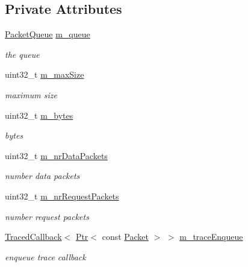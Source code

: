 \subsection*{Private Attributes}
\begin{DoxyCompactItemize}
\item 
\hyperlink{classns3_1_1WimaxMacQueue_a075c9b703ce5eef7fe1844db1758657a}{Packet\+Queue} \hyperlink{classns3_1_1WimaxMacQueue_ad372c20acfe0acf6df6280662d63bdae}{m\+\_\+queue}
\begin{DoxyCompactList}\small\item\em the queue \end{DoxyCompactList}\item 
uint32\+\_\+t \hyperlink{classns3_1_1WimaxMacQueue_aca04b5018ab36d96092f19467d381efd}{m\+\_\+max\+Size}
\begin{DoxyCompactList}\small\item\em maximum size \end{DoxyCompactList}\item 
uint32\+\_\+t \hyperlink{classns3_1_1WimaxMacQueue_a79c3fd93dfef8c78b074c2aa6f2266ea}{m\+\_\+bytes}
\begin{DoxyCompactList}\small\item\em bytes \end{DoxyCompactList}\item 
uint32\+\_\+t \hyperlink{classns3_1_1WimaxMacQueue_ac47e05e3e877edf7d7a3d2b5d20d514a}{m\+\_\+nr\+Data\+Packets}
\begin{DoxyCompactList}\small\item\em number data packets \end{DoxyCompactList}\item 
uint32\+\_\+t \hyperlink{classns3_1_1WimaxMacQueue_ad71c2599f50a2be15f7ce9abba5a539d}{m\+\_\+nr\+Request\+Packets}
\begin{DoxyCompactList}\small\item\em number request packets \end{DoxyCompactList}\item 
\hyperlink{classns3_1_1TracedCallback}{Traced\+Callback}$<$ \hyperlink{classns3_1_1Ptr}{Ptr}$<$ const \hyperlink{classns3_1_1Packet}{Packet} $>$ $>$ \hyperlink{classns3_1_1WimaxMacQueue_a4adff7167ee1ca8490d246560770ea20}{m\+\_\+trace\+Enqueue}
\begin{DoxyCompactList}\small\item\em enqueue trace callback \end{DoxyCompactList}\item 

\end{DoxyCompactItemize}
